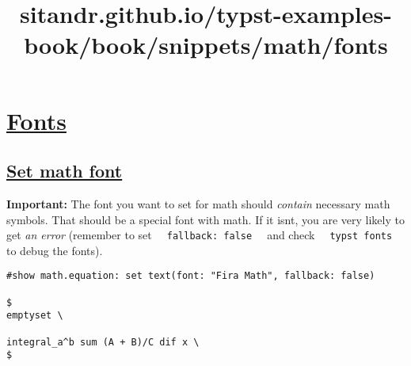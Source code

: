 \title{sitandr.github.io/typst-examples-book/book/snippets/math/fonts}

\section{\texorpdfstring{\hyperref[fonts]{Fonts}}{Fonts}}\label{fonts}

\subsection{\texorpdfstring{\hyperref[set-math-font]{Set math
font}}{Set math font}}\label{set-math-font}

\textbf{Important:} The font you want to set for math should
\emph{contain} necessary math symbols. That should be a special font
with math. If it isn\textquotesingle t, you are very likely to get
\emph{an error} (remember to set
\texttt{\ }{\texttt{\ fallback:\ false\ }}\texttt{\ } and check
\texttt{\ }{\texttt{\ typst\ fonts\ }}\texttt{\ } to debug the fonts).

\begin{verbatim}
#show math.equation: set text(font: "Fira Math", fallback: false)

$
emptyset \

integral_a^b sum (A + B)/C dif x \
$
\end{verbatim}

\pandocbounded{}
